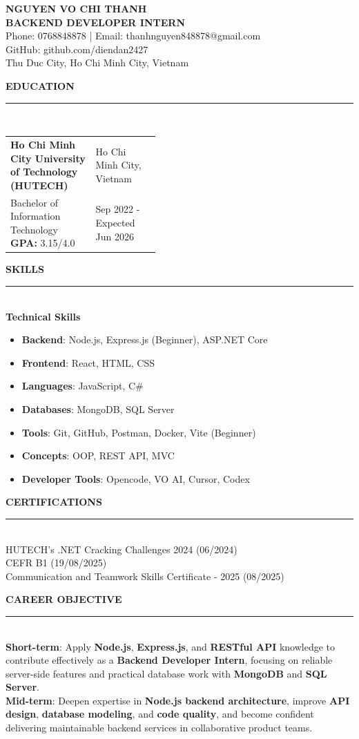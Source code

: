 \documentclass[10pt,a4paper]{article}
\newcommand{\cvsection}[1]{
  \vspace{8pt}
  {\fontsize{14}{17}\selectfont\textbf{\textcolor{headingblue}{\MakeUppercase{#1}}}}\\[-3pt]
  \textcolor{linegray}{\rule{\linewidth}{0.6pt}}\\[2pt]
}
\begin{document}
\begin{center}
	{\fontsize{31}{35}\selectfont\textbf{\textcolor{headingblue}{NGUYEN VO CHI THANH}}}\\[4pt]
	{\fontsize{14}{16}\selectfont\textbf{BACKEND DEVELOPER INTERN}}\\[5pt]
	{\fontsize{11.5}{13.5}\selectfont Phone: 0768848878 \;|\; Email: thanhnguyen848878@gmail.com}\\[1pt]
	{\fontsize{11.5}{13.5}\selectfont GitHub: github.com/diendan2427}\\[1pt]
	{\fontsize{11.5}{13.5}\selectfont Thu Duc City, Ho Chi Minh City, Vietnam}
\end{center}

\cvsection{Education}
\vspace{1pt}
\begin{tabularx}{\linewidth}{@{}X>{\raggedleft\arraybackslash}p{0.43\linewidth}@{}}
	\textbf{Ho Chi Minh City University of Technology (HUTECH)} & Ho Chi Minh City, Vietnam    \\[2pt]
	Bachelor of Information Technology \textbf{GPA:} 3.15/4.0   & Sep 2022 - Expected Jun 2026
\end{tabularx}
\vspace{-4pt}

\cvsection{Skills}
\textbf{Technical Skills}
\begin{itemize}
	\item \textbf{Backend}: Node.js, Express.js (Beginner), ASP.NET Core
	\item \textbf{Frontend}: React, HTML, CSS
	\item \textbf{Languages}: JavaScript, C\#
	\item \textbf{Databases}: MongoDB, SQL Server
	\item \textbf{Tools}: Git, GitHub, Postman, Docker, Vite (Beginner)
	\item \textbf{Concepts}: OOP, REST API, MVC
	\item \textbf{Developer Tools}: Opencode, VO AI, Cursor, Codex
\end{itemize}

\cvsection{Certifications}
HUTECH's .NET Cracking Challenges 2024 (06/2024)\\[2pt]
CEFR B1 (19/08/2025)\\[2pt]
Communication and Teamwork Skills Certificate - 2025 (08/2025)

\cvsection{Career Objective}
\textbf{Short-term}: Apply \textbf{Node.js}, \textbf{Express.js}, and \textbf{RESTful API} knowledge to contribute effectively as a \textbf{Backend Developer Intern}, focusing on reliable server-side features and practical database work with \textbf{MongoDB} and \textbf{SQL Server}.\\[5pt]
\textbf{Mid-term}: Deepen expertise in \textbf{Node.js backend architecture}, improve \textbf{API design}, \textbf{database modeling}, and \textbf{code quality}, and become confident delivering maintainable backend services in collaborative product teams.
\end{document}
